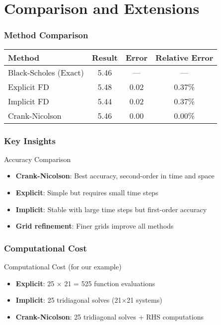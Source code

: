 \documentclass[aspectratio=169]{beamer}
\begin{document}
\section{Comparison and Extensions}

\begin{frame}
\frametitle{Method Comparison}
\begin{center}
\begin{tabular}{lccc}
\toprule
\textbf{Method} & \textbf{Result} & \textbf{Error} & \textbf{Relative Error} \\
\midrule
Black-Scholes (Exact) & 5.46 & --- & --- \\
Explicit FD & 5.48 & 0.02 & 0.37\% \\
Implicit FD & 5.44 & 0.02 & 0.37\% \\
Crank-Nicolson & 5.46 & 0.00 & 0.00\% \\
\bottomrule
\end{tabular}
\end{center}
\end{frame}

\begin{frame}
\frametitle{Key Insights}
\begin{block}{Accuracy Comparison}
\begin{itemize}
\item \textbf{Crank-Nicolson}: Best accuracy, second-order in time and space
\item \textbf{Explicit}: Simple but requires small time steps
\item \textbf{Implicit}: Stable with large time steps but first-order accuracy
\item \textbf{Grid refinement}: Finer grids improve all methods
\end{itemize}
\end{block}
\end{frame}

\begin{frame}
\frametitle{Computational Cost}
\begin{block}{Computational Cost (for our example)}
\begin{itemize}
\item \textbf{Explicit}: 25 × 21 = 525 function evaluations
\item \textbf{Implicit}: 25 tridiagonal solves (21×21 systems)
\item \textbf{Crank-Nicolson}: 25 tridiagonal solves + RHS computations
\end{itemize}
\end{block}
\end{frame}
\end{document}
